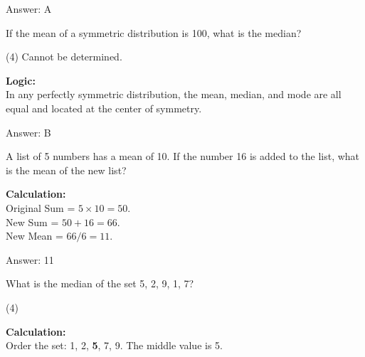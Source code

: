 \documentclass[11pt,paper=a4,answers]{exam}
\begin{document}
\begin{questions}
\begin{solution}
Answer: \colorbox{yellow!100}{A}
\end{solution}

\vspace{60pt}

\question
If the mean of a symmetric distribution is 100, what is the median?
\begin{tasks}(4)
    \task Cannot be determined.
\end{tasks}

\begin{solution}
\textbf{Logic:} \\
In any perfectly symmetric distribution, the mean, median, and mode are all equal and located at the center of symmetry.

\vspace{30pt}

Answer: \colorbox{yellow!100}{B}
\end{solution}

\vspace{60pt}

\question
A list of 5 numbers has a mean of 10. If the number 16 is added to the list, what is the mean of the new list?

\begin{solution}
\textbf{Calculation:} \\
Original Sum = $5 \times 10 = 50$. \\
New Sum = $50 + 16 = 66$. \\
New Mean = $66 / 6 = 11$.

\vspace{30pt}

Answer: \colorbox{yellow!100}{11}
\end{solution}

\vspace{60pt}

\question
What is the median of the set {5, 2, 9, 1, 7}?
\begin{tasks}(4)
\end{tasks}

\begin{solution}
\textbf{Calculation:} \\
Order the set: 1, 2, \textbf{5}, 7, 9. 
The middle value is 5.


\end{solution}
\end{questions}
\end{document}
